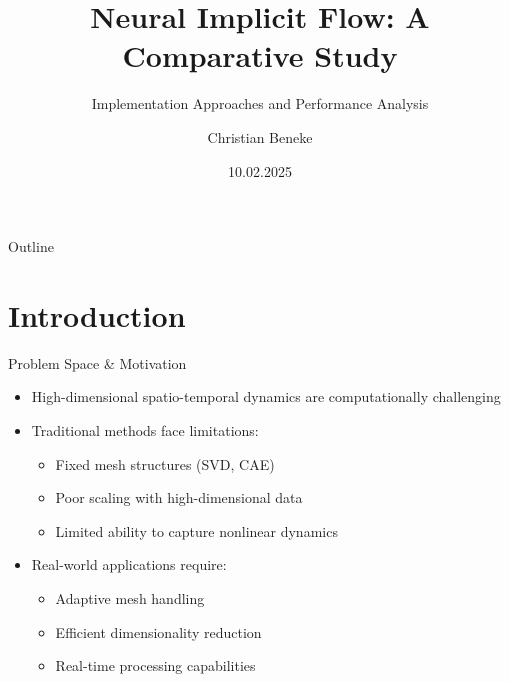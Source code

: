 \documentclass{beamer}
\title{Neural Implicit Flow: A Comparative Study}
\subtitle{Implementation Approaches and Performance Analysis}
\author{Christian Beneke}
\date{10.02.2025}
\begin{document}
\begin{frame}
    \titlepage
\end{frame}

\begin{frame}{Outline}
    \tableofcontents
\end{frame}

\section{Introduction}
\begin{frame}{Problem Space \& Motivation}
    \begin{itemize}
        \item High-dimensional spatio-temporal dynamics are computationally challenging
        \item Traditional methods face limitations:
        \begin{itemize}
            \item Fixed mesh structures (SVD, CAE)
            \item Poor scaling with high-dimensional data
            \item Limited ability to capture nonlinear dynamics
        \end{itemize}
        \item Real-world applications require:
        \begin{itemize}
            \item Adaptive mesh handling
            \item Efficient dimensionality reduction
            \item Real-time processing capabilities
        \end{itemize}
    \end{itemize}
\end{frame}
\end{document}
